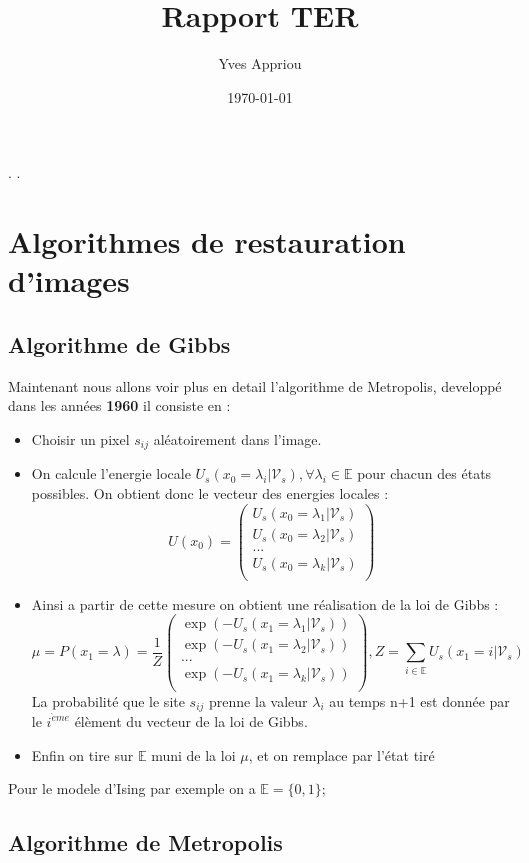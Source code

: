 \documentclass[a4paper, 12pt]{article}
\title{Rapport TER}
\author{Yves Appriou}
\date{\today}
\begin{document}
\maketitle

\tableofcontents.
\newpage.
\section{Algorithmes de restauration d'images}
\subsection[Algorithme de Gibbs]{Algorithme de Gibbs}
Maintenant nous allons voir plus en detail l'algorithme de Metropolis, developpé dans les années \textbf{1960} il consiste en : 
\begin{itemize}
\item Choisir un pixel $s_{ij} $ aléatoirement dans l'image.
\item On calcule l'energie locale $U_s(x_0=\lambda_i| \mathcal{V}_s), \forall \lambda_i \in \mathbb{E}  $ pour chacun des états possibles. On obtient donc le vecteur des energies locales : 
\[
  U(x_0) = \left(
          \begin{array}{ll}
            U_s(x_0=\lambda_1| \mathcal{V}_s) \\
            U_s(x_0=\lambda_2| \mathcal{V}_s) \\
            ...\\
            U_s(x_0=\lambda_k| \mathcal{V}_s) \\
          \end{array}
        \right)
\]
\item Ainsi a partir de cette mesure on obtient une réalisation de la loi de Gibbs : 
\[
  \mu = P(x_1 = \lambda) = \frac{1}{Z} \left(
          \begin{array}{ll}
            \exp(-U_s(x_1=\lambda_1| \mathcal{V}_s)) \\
            \exp(-U_s(x_1=\lambda_2| \mathcal{V}_s)) \\
            ...\\
            \exp(-U_s(x_1=\lambda_k| \mathcal{V}_s)) \\
          \end{array}
        \right)
        , Z= \sum_{i\in \mathbb{E}} {U_s(x_1=i | \mathcal{V}_s)}
\]
La probabilité que le site $s_{ij}$ prenne la valeur $\lambda_i$ au temps n+1 est donnée par le $i^{\grave{e}me}$ élèment du vecteur de la loi de Gibbs.
\item Enfin on tire sur $\mathbb{E}$ muni de la loi $\mu$, et on remplace par l'état tiré
\end{itemize}
Pour le modele d'Ising par exemple on a $\mathbb{E} =\{0,1\}$;

\subsection[Algorithme de Metropolis]{Algorithme de Metropolis}
\end{document}
